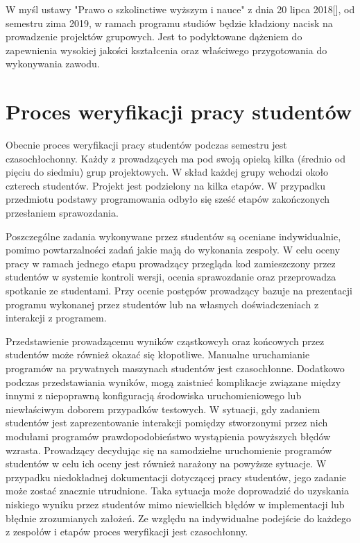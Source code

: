 W myśl ustawy "Prawo o szkolinctiwe wyższym i nauce" z dnia 20 lipca 2018[], od semestru zima 2019, w ramach programu studiów będzie kładziony nacisk na prowadzenie projektów grupowych.
Jest to podyktowane dążeniem do zapewnienia wysokiej jakości kształcenia oraz właściwego przygotowania do wykonywania zawodu.

\vfill

\section{Proces weryfikacji pracy studentów}

Obecnie proces weryfikacji pracy studentów podczas semestru jest czasochłochonny.
Każdy z prowadzących ma pod swoją opieką kilka (średnio od pięciu do siedmiu) grup projektowych.
W skład każdej grupy wchodzi około czterech studentów.
Projekt jest podzielony na kilka etapów. 
W przypadku przedmiotu podstawy programowania odbyło się sześć etapów zakończonych przesłaniem sprawozdania.

Poszczególne zadania wykonywane przez studentów są oceniane indywidualnie, pomimo powtarzalności zadań jakie mają do wykonania zespoły.
W celu oceny pracy w ramach jednego etapu prowadzący przegląda kod zamieszczony przez studentów w systemie kontroli wersji, ocenia sprawozdanie oraz przeprowadza spotkanie ze studentami.
Przy ocenie postępów prowadzący bazuje na prezentacji programu wykonanej przez studentów lub na własnych doświadczeniach z interakcji z programem.

Przedstawienie prowadzącemu wyników cząstkowcyh oraz końcowych przez studentów może również okazać się kłopotliwe.
Manualne uruchamianie programów na prywatnych maszynach studentów jest czasochłonne.
Dodatkowo podczas przedstawiania wyników, mogą zaistnieć komplikacje związane między innymi z niepoprawną konfiguracją środowiska uruchomieniowego lub niewłaściwym doborem przypadków testowych.
W sytuacji, gdy zadaniem studentów jest zaprezentowanie interakcji pomiędzy stworzonymi przez nich modułami programów prawdopodobieństwo wystąpienia powyższych błędów wzrasta.
Prowadzący decydując się na samodzielne uruchomienie programów studentów w celu ich oceny jest również narażony na powyższe sytuacje.
W przypadku niedokładnej dokumentacji dotyczącej pracy studentów, jego zadanie może zostać znacznie utrudnione.
Taka sytuacja może doprowadzić do uzyskania niskiego wyniku przez studentów mimo niewielkich błędów w implementacji lub błędnie zrozumianych założeń.
Ze względu na indywidualne podejście do każdego z zespołów i etapów proces weryfikacji jest czasochłonny.

